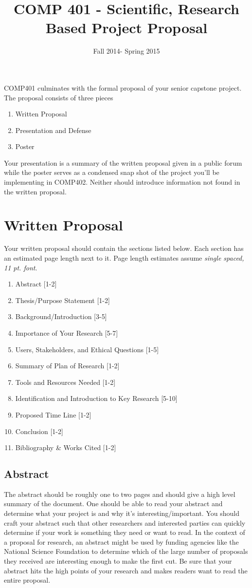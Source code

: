 \documentclass[10pt]{article}
\title{COMP 401 - Scientific, Research Based Project Proposal}
\author{  }
\date{Fall 2014- Spring 2015}
\begin{document}
\maketitle

COMP401 culminates with the formal proposal of your senior capstone project.  The proposal consists of three pieces
\begin{enumerate}
\item Written Proposal
\item Presentation and Defense 
\item Poster
\end{enumerate}
Your presentation is a summary of the written proposal given in a public forum while the poster serves as a condensed snap shot of the project you'll be implementing in COMP402.  Neither should introduce information not found in the written proposal.

\section{Written Proposal}

Your written proposal should contain the sections listed below.  Each section has an estimated page length next to it.  Page length estimates assume \textit{single spaced, 11 pt. font}.   
\begin{enumerate}
\item Abstract [1-2]
\item Thesis/Purpose Statement [1-2]
\item Background/Introduction [3-5]
\item Importance of Your Research [5-7]
\item Users, Stakeholders, and Ethical Questions [1-5]
\item Summary of Plan of Research [1-2]
\item Tools and Resources Needed [1-2]
\item Identification and Introduction to Key Research [5-10]
\item Proposed Time Line [1-2]
\item Conclusion [1-2]
\item Bibliography \& Works Cited [1-2]
\end{enumerate}

\subsection{Abstract}
The abstract should be roughly one to two pages and should give a high level summary of the document.  One should be able to read your abstract and determine what your project is and why it's interesting/important.  You should craft your abstract such that other researchers and interested parties can quickly determine if your work is something they need or want to read.  In the context of a proposal for research, an abstract might be used by funding agencies like the National Science Foundation to determine which of the large number of proposals they received are interesting enough to make the first cut.  Be sure that your abstract hits the high points of your research and makes readers want to read the entire proposal.
\end{document}
